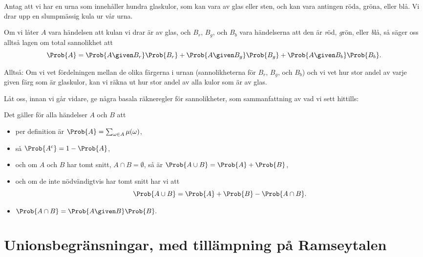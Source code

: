 \documentclass[nobib]{tufte-handout}
\begin{document}
\begin{example}
    Antag att vi har en urna som innehåller hundra glaskulor, som kan vara av glas eller sten, och kan vara antingen röda, gröna, eller blå. Vi drar upp en slumpmässig kula ur vår urna.

    Om vi låter $A$ vara händelsen att kulan vi drar är av glas, och $B_r$, $B_g$, och $B_b$ vara händelserna att den är \emph{r}öd, \emph{g}rön, eller \emph{b}lå, så säger oss alltså lagen om total sannolikhet att
    $$\Prob{A} = \Prob{A \given B_r}\Prob{B_r} + \Prob{A \given B_g}\Prob{B_g} + \Prob{A \given B_b}\Prob{B_b}.$$

    Alltså: Om vi vet fördelningen mellan de olika färgerna i urnan (sannolikheterna för $B_r$, $B_g$, och $B_b$) och vi vet hur stor andel av varje given färg som är glaskulor, kan vi räkna ut hur stor andel av alla kulor som är av glas.
\end{example}

Låt oss, innan vi går vidare, ge några basala räkneregler för sannolikheter, som sammanfattning av vad vi sett hittills:

\begin{lemma}
    Det gäller för alla händelser $A$ och $B$ att
    \begin{itemize}
        \item per definition är $\Prob{A} = \sum_{\omega \in A} \mu(\omega)$,
        \item så $\Prob{A^c} = 1 - \Prob{A}$,
        \item och om $A$ och $B$ har tomt snitt, $A\cap B = \emptyset$, så är $\Prob{A \cup B} = \Prob{A} + \Prob{B}$,
        \item och om de inte nödvändigtvis har tomt snitt har vi att
        $$\Prob{A \cup B} = \Prob{A} + \Prob{B} - \Prob{A \cap B}.$$
        \item $\Prob{A \cap B} = \Prob{A \given B}\Prob{B}.$
    \end{itemize}
  \end{lemma}

\section{Unionsbegränsningar, med tillämpning på Ramseytalen}
\end{document}
